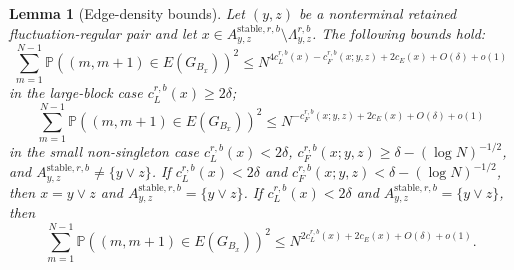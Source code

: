 \documentclass[11pt]{article}
\newtheorem{lem}{Lemma}
\newcommand{\Pbb}{\mathbb P}
\newcommand{\stable}{\mathrm{stable}}
\begin{document}
\begin{lem}[Edge-density bounds]
Let \((y,z)\) be a nonterminal retained fluctuation-regular pair and let
\(x\in A_{y,z}^{\stable,r,b}\setminus\Lambda_{y,z}^{r,b}\). The
following bounds hold:
\[
    \sum_{m=1}^{N-1}\Pbb((m,m+1)\in E(G_{B_x}))^2
    \le N^{4c_L^{r,b}(x)-c_F^{r,b}(x;y,z)+2c_E(x)+O(\delta)+o(1)}
\]
in the large-block case \(c_L^{r,b}(x)\ge2\delta\);
\[
    \sum_{m=1}^{N-1}\Pbb((m,m+1)\in E(G_{B_x}))^2
    \le N^{-c_F^{r,b}(x;y,z)+2c_E(x)+O(\delta)+o(1)}
\]
in the small non-singleton case
\(c_L^{r,b}(x)<2\delta\),
\(c_F^{r,b}(x;y,z)\ge\delta-(\log N)^{-1/2}\), and
\(A_{y,z}^{\stable,r,b}\ne\{y\vee z\}\). If
\(c_L^{r,b}(x)<2\delta\) and
\(c_F^{r,b}(x;y,z)<\delta-(\log N)^{-1/2}\), then \(x=y\vee z\) and
\(A_{y,z}^{\stable,r,b}=\{y\vee z\}\). If
\(c_L^{r,b}(x)<2\delta\) and
\(A_{y,z}^{\stable,r,b}=\{y\vee z\}\), then
\[
    \sum_{m=1}^{N-1}\Pbb((m,m+1)\in E(G_{B_x}))^2
    \le N^{2c_L^{r,b}(x)+2c_E(x)+O(\delta)+o(1)}.
\]
\end{lem}
\end{document}
